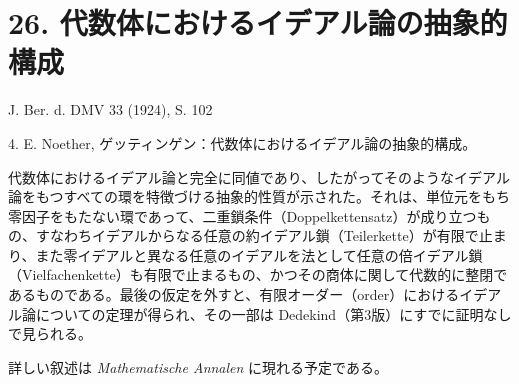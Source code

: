 \documentclass[11pt]{article}
\begin{document}
\section*{26. 代数体におけるイデアル論の抽象的構成}

\begin{center}
J. Ber. d. DMV 33 (1924), S. 102
\end{center}

4. E. Noether, ゲッティンゲン：代数体におけるイデアル論の抽象的構成。

代数体におけるイデアル論と完全に同値であり、したがってそのようなイデアル論をもつすべての環を特徴づける抽象的性質が示された。それは、単位元をもち零因子をもたない環であって、二重鎖条件（Doppelkettensatz）が成り立つもの、すなわちイデアルからなる任意の約イデアル鎖（Teilerkette）が有限で止まり、また零イデアルと異なる任意のイデアルを法として任意の倍イデアル鎖（Vielfachenkette）も有限で止まるもの、かつその商体に関して代数的に整閉であるものである。最後の仮定を外すと、有限オーダー（order）におけるイデアル論についての定理が得られ、その一部は Dedekind（第3版）にすでに証明なしで見られる。

詳しい叙述は \emph{Mathematische Annalen} に現れる予定である。
\end{document}
